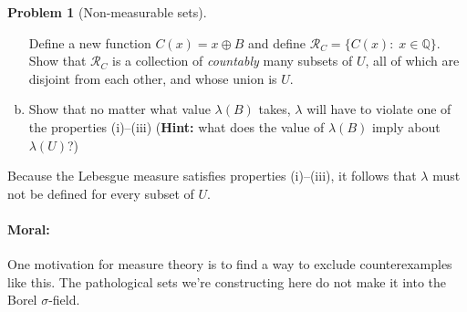\documentclass{article}
\newcommand{\cR}{\mathcal{R}}
\newcommand{\QQ}{\mathbb{Q}}
\theoremstyle{definition}
\newtheorem{problem}{Problem}
\begin{document}
\begin{problem}[Non-measurable sets]
\begin{enumerate}[(a)]
Define a new function $C(x) = x \oplus B$ and define $\cR_C = \{C(x):\; x \in \QQ\}$. Show that $\cR_C$ is a collection of {\em countably} many subsets of $U$, all of which are disjoint from each other, and whose union is $U$.


\item Show that no matter what value $\lambda(B)$ takes, $\lambda$ will have to violate one of the properties (i)--(iii) ({\bf Hint:} what does the value of $\lambda(B)$ imply about $\lambda(U)$?)

\end{enumerate}

Because the Lebesgue measure satisfies properties (i)--(iii), it follows that $\lambda$ must not be defined for every subset of $U$.

\paragraph{Moral:} One motivation for measure theory is to find a way to exclude counterexamples like this. The pathological sets we're constructing here do not make it into the Borel $\sigma$-field.

\end{problem}
\end{document}
